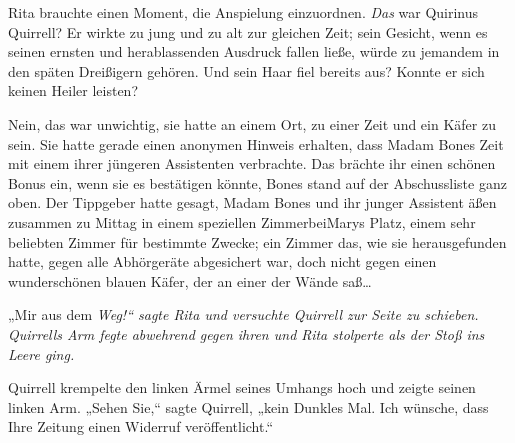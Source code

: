 Rita brauchte einen Moment, die Anspielung einzuordnen. \emph{Das} war Quirinus Quirrell? Er wirkte zu jung und zu alt zur gleichen Zeit; sein Gesicht, wenn es seinen ernsten und herablassenden Ausdruck fallen ließe, würde zu jemandem in den späten Dreißigern gehören. Und sein Haar fiel bereits aus? Konnte er sich keinen Heiler leisten?

Nein, das war unwichtig, sie hatte an einem Ort, zu einer Zeit und ein Käfer zu sein. Sie hatte gerade einen anonymen Hinweis erhalten, dass Madam Bones Zeit mit einem ihrer jüngeren Assistenten verbrachte. Das brächte ihr einen schönen Bonus ein, wenn sie es bestätigen könnte, Bones stand auf der Abschussliste ganz oben. Der Tippgeber hatte gesagt, Madam Bones und ihr junger Assistent äßen zusammen zu Mittag in einem speziellen ZimmerbeiMarys Platz, einem sehr beliebten Zimmer für bestimmte Zwecke; ein Zimmer das, wie sie herausgefunden hatte, gegen alle Abhörgeräte abgesichert war, doch nicht gegen einen wunderschönen blauen Käfer, der an einer der Wände saß…

„Mir aus dem \emph{Weg!“ sagte Rita und versuchte Quirrell zur Seite zu schieben. Quirrells Arm fegte abwehrend gegen ihren und Rita stolperte als der Stoß ins Leere ging.}

Quirrell krempelte den linken Ärmel seines Umhangs hoch und zeigte seinen linken Arm. „Sehen Sie,“ sagte Quirrell, „kein Dunkles Mal. Ich wünsche, dass Ihre Zeitung einen Widerruf veröffentlicht.“


